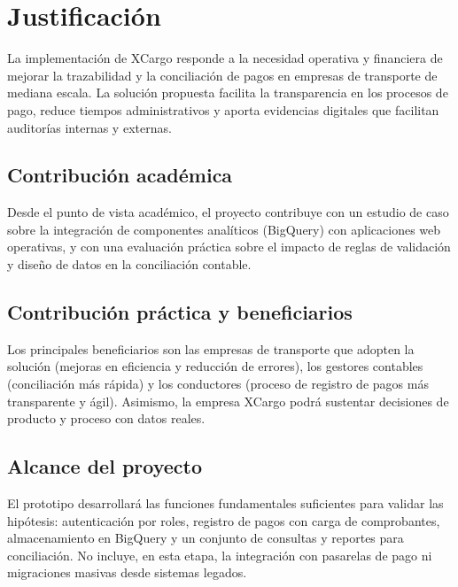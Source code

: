 

\section{Justificación}

La implementación de XCargo responde a la necesidad operativa y financiera de mejorar la trazabilidad y la conciliación de pagos en empresas de transporte de mediana escala. La solución propuesta facilita la transparencia en los procesos de pago, reduce tiempos administrativos y aporta evidencias digitales que facilitan auditorías internas y externas.

\subsection{Contribución académica}
Desde el punto de vista académico, el proyecto contribuye con un estudio de caso sobre la integración de componentes analíticos (BigQuery) con aplicaciones web operativas, y con una evaluación práctica sobre el impacto de reglas de validación y diseño de datos en la conciliación contable.

\subsection{Contribución práctica y beneficiarios}
Los principales beneficiarios son las empresas de transporte que adopten la solución (mejoras en eficiencia y reducción de errores), los gestores contables (conciliación más rápida) y los conductores (proceso de registro de pagos más transparente y ágil). Asimismo, la empresa XCargo podrá sustentar decisiones de producto y proceso con datos reales.

\subsection{Alcance del proyecto}
El prototipo desarrollará las funciones fundamentales suficientes para validar las hipótesis: autenticación por roles, registro de pagos con carga de comprobantes, almacenamiento en BigQuery y un conjunto de consultas y reportes para conciliación. No incluye, en esta etapa, la integración con pasarelas de pago ni migraciones masivas desde sistemas legados.

